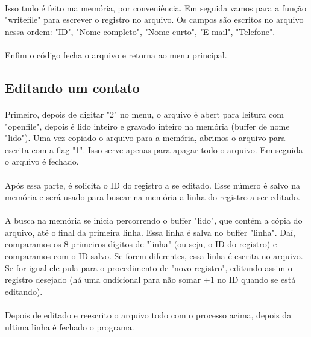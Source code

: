 \documentclass[12pt]{article}
\begin{document}
    \paragraph{}
    Isso tudo é feito ma memória, por conveniência. Em seguida vamos para a função "writefile" para escrever o registro no arquivo. Os campos são escritos no arquivo nessa ordem: "ID", "Nome completo", "Nome curto", "E-mail", "Telefone".
    \paragraph{}
    Enfim o código fecha o arquivo e retorna ao menu principal.
    
\subsection{Editando um contato}
    \paragraph{}
    Primeiro, depois de digitar "2" no menu, o arquivo é abert para leitura com "openfile", depois é lido inteiro e gravado inteiro na memória (buffer de nome "lido"). Uma vez copiado o arquivo para a memória, abrimos o arquivo para escrita com a flag "1". Isso serve apenas para apagar todo o arquivo. Em seguida o arquivo é fechado.
    \paragraph{}
    Após essa parte, é solicita o ID do registro a se editado. Esse número é salvo na memória e será usado para buscar na memória a linha do registro a ser editado. 
    \paragraph{}
    A busca na memória se inicia percorrendo o buffer "lido", que contém a cópia do arquivo, até o final da primeira linha. Essa linha é salva no buffer "linha". Daí, comparamos os 8 primeiros dígitos de "linha" (ou seja, o ID do registro) e comparamos com o ID salvo. Se forem diferentes, essa linha é escrita no arquivo. Se for igual ele pula para o procedimento de "novo registro", editando assim o registro desejado (há uma ondicional para não somar +1 no ID quando se está editando).
    \paragraph{}
    Depois de editado e reescrito o arquivo todo com o processo acima, depois da ultima linha é fechado o programa.
\end{document}
